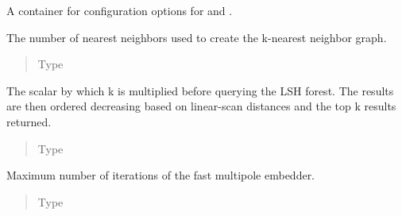 \documentclass[letterpaper,10pt,english]{sphinxmanual}
\begin{document}
\begin{fulllineitems}
\label{\detokenize{documentation:tmap.LayoutConfiguration}}
A container for configuration options for {\hyperref[\detokenize{documentation:tmap.layout_from_lsh_forest}]{}} and {\hyperref[\detokenize{documentation:tmap.layout_from_edge_list}]{}}.


\begin{fulllineitems}
The number of nearest neighbors used to create the k-nearest neighbor graph.
\begin{quote}\begin{description}
\item[{Type}] \leavevmode
{}

\end{description}\end{quote}

\end{fulllineitems}



\begin{fulllineitems}
The scalar by which k is multiplied before querying the LSH forest. The results are then ordered decreasing based on linear-scan distances and the top k results returned.
\begin{quote}\begin{description}
\item[{Type}] \leavevmode
{}

\end{description}\end{quote}

\end{fulllineitems}



\begin{fulllineitems}
Maximum number of iterations of the fast multipole embedder.
\begin{quote}\begin{description}
\item[{Type}] \leavevmode
{}


\end{description}
\end{quote}
\end{fulllineitems}
\end{fulllineitems}
\end{document}
